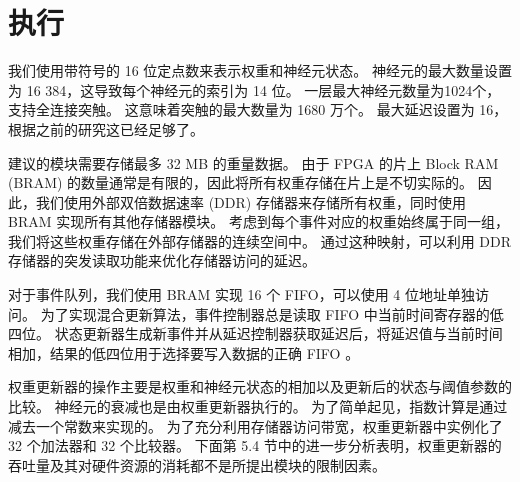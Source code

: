\section{执行}

我们使用带符号的 16 位定点数来表示权重和神经元状态。 
神经元的最大数量设置为 16 384，这导致每个神经元的索引为 14 位。 一层最大神经元数量为1024个，支持全连接突触。 
这意味着突触的最大数量为 1680 万个。 最大延迟设置为 16，根据之前的研究这已经足够了。

建议的模块需要存储最多 32 MB 的重量数据。 由于 FPGA 的片上 Block RAM (BRAM) 的数量通常是有限的，因此将所有权重存储在片上是不切实际的。 
因此，我们使用外部双倍数据速率 (DDR) 存储器来存储所有权重，同时使用 BRAM 实现所有其他存储器模块。 
考虑到每个事件对应的权重始终属于同一组，我们将这些权重存储在外部存储器的连续空间中。 
通过这种映射，可以利用 DDR 存储器的突发读取功能来优化存储器访问的延迟。

对于事件队列，我们使用 BRAM 实现 16 个 FIFO，可以使用 4 位地址单独访问。 
为了实现混合更新算法，事件控制器总是读取 FIFO 中当前时间寄存器的低四位。 
状态更新器生成新事件并从延迟控制器获取延迟后，将延迟值与当前时间相加，结果的低四位用于选择要写入数据的正确 FIFO 。

权重更新器的操作主要是权重和神经元状态的相加以及更新后的状态与阈值参数的比较。 
神经元的衰减也是由权重更新器执行的。 为了简单起见，指数计算是通过减去一个常数来实现的。 
为了充分利用存储器访问带宽，权重更新器中实例化了 32 个加法器和 32 个比较器。 
下面第 5.4 节中的进一步分析表明，权重更新器的吞吐量及其对硬件资源的消耗都不是所提出模块的限制因素。
